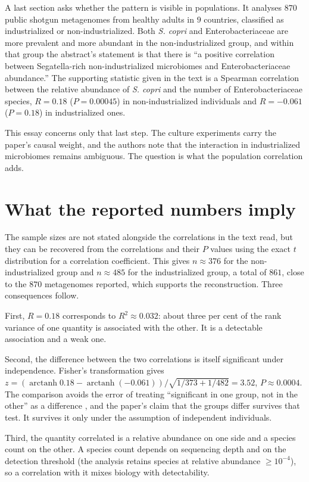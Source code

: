 \documentclass[11pt]{article}
\theoremstyle{definition}
\begin{document}
A last section asks whether the pattern is visible in populations. It analyses $870$ public shotgun metagenomes from healthy adults in $9$ countries, classified as industrialized or non-industrialized. Both \emph{S. copri} and Enterobacteriaceae are more prevalent and more abundant in the non-industrialized group, and within that group the abstract's statement is that there is ``a positive correlation between Segatella-rich non-industrialized microbiomes and Enterobacteriaceae abundance.'' The supporting statistic given in the text is a Spearman correlation between the relative abundance of \emph{S. copri} and the number of Enterobacteriaceae species, $R=0.18$ ($P=0.00045$) in non-industrialized individuals and $R=-0.061$ ($P=0.18$) in industrialized ones.

This essay concerns only that last step. The culture experiments carry the paper's causal weight, and the authors note that the interaction in industrialized microbiomes remains ambiguous. The question is what the population correlation adds.

\section{What the reported numbers imply}

The sample sizes are not stated alongside the correlations in the text read, but they can be recovered from the correlations and their $P$ values using the exact $t$ distribution for a correlation coefficient. This gives $n\approx376$ for the non-industrialized group and $n\approx485$ for the industrialized group, a total of $861$, close to the $870$ metagenomes reported, which supports the reconstruction. Three consequences follow.

First, $R=0.18$ corresponds to $R^2\approx0.032$: about three per cent of the rank variance of one quantity is associated with the other. It is a detectable association and a weak one.

Second, the difference between the two correlations is itself significant under independence. Fisher's transformation gives $z=(\operatorname{arctanh}0.18-\operatorname{arctanh}(-0.061))/\sqrt{1/373+1/482}=3.52$, $P\approx0.0004$. The comparison avoids the error of treating ``significant in one group, not in the other'' as a difference \citep{gelmanstern2006}, and the paper's claim that the groups differ survives that test. It survives it only under the assumption of independent individuals.

Third, the quantity correlated is a relative abundance on one side and a species count on the other. A species count depends on sequencing depth and on the detection threshold (the analysis retains species at relative abundance $\ge10^{-4}$), so a correlation with it mixes biology with detectability.
\end{document}
